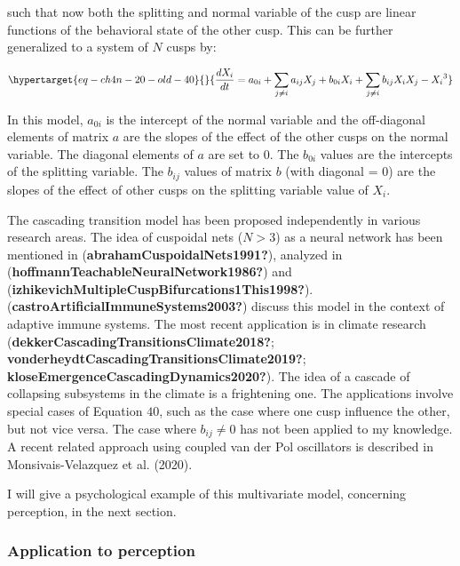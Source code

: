 \documentclass[
  a4paper,
  DIV=11,
  numbers=noendperiod,
  oneside]{scrreprt}
\begin{document}
such that now both the splitting and normal variable of the cusp are
linear functions of the behavioral state of the other cusp. This can be
further generalized to a system of \(N\) cusps by:

\begin{equation}\protect\hypertarget{eq-ch4n-20-old-40}{}{
\frac{dX_{i}}{dt} = a_{0i} + \sum_{j \neq i}^{}{a_{ij}X_{j}} + b_{0i}X_{i} + \sum_{j \neq i}^{}{b_{ij}X_{i}X_{j}} - {X_{i}}^{3}
}\label{eq-ch4n-20-old-40}\end{equation}

In this model, \(a_{0i}\) is the intercept of the normal variable and
the off-diagonal elements of matrix \(a\) are the slopes of the effect
of the other cusps on the normal variable. The diagonal elements of
\(a\) are set to 0. The \(b_{0i}\) values are the intercepts of the
splitting variable. The \(b_{ij}\) values of matrix \(b\) (with diagonal
= 0) are the slopes of the effect of other cusps on the splitting
variable value of \(X_{i}\).

The cascading transition model has been proposed independently in
various research areas. The idea of cuspoidal nets (\(N>3\)) as a neural
network has been mentioned in (\textbf{abrahamCuspoidalNets1991?}),
analyzed in (\textbf{hoffmannTeachableNeuralNetwork1986?}) and
(\textbf{izhikevichMultipleCuspBifurcations1This1998?}).
(\textbf{castroArtificialImmuneSystems2003?}) discuss this model in the
context of adaptive immune systems. The most recent application is in
climate research (\textbf{dekkerCascadingTransitionsClimate2018?};
\textbf{vonderheydtCascadingTransitionsClimate2019?};
\textbf{kloseEmergenceCascadingDynamics2020?}). The idea of a cascade of
collapsing subsystems in the climate is a frightening one. The
applications involve special cases of Equation \(40\), such as the case
where one cusp influence the other, but not vice versa. The case where
\(b_{ij} \neq 0\) has not been applied to my knowledge. A recent related
approach using coupled van der Pol oscillators is described in
Monsivais-Velazquez et al. (2020).

I will give a psychological example of this multivariate model,
concerning perception, in the next section.

\hypertarget{sec-Application-to-perception}{%
\subsubsection{Application to
perception}\label{sec-Application-to-perception}}
\end{document}
